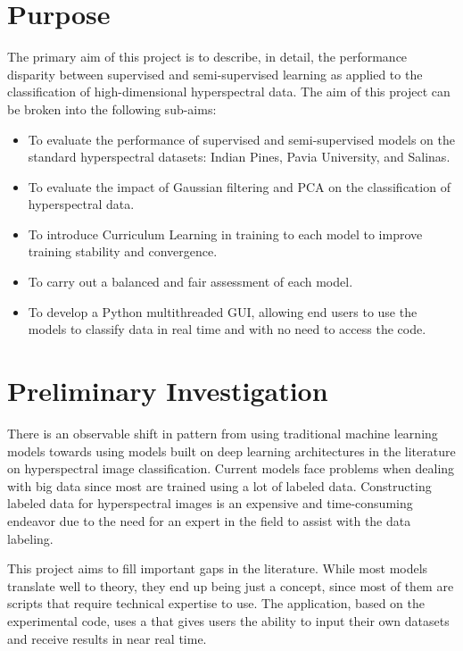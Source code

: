 \section{Purpose}
The primary aim of this project is to describe, in detail, the performance disparity between supervised and semi-supervised learning as applied to the classification of high-dimensional hyperspectral data. The aim of this project can be broken into the following sub-aims:
\begin{itemize}
    \item To evaluate the performance of supervised and semi-supervised models on the standard hyperspectral datasets: Indian Pines, Pavia University, and Salinas.
    \item To evaluate the impact of Gaussian filtering and PCA on the classification of hyperspectral data.
    \item To introduce Curriculum Learning in training to each model to improve training stability and convergence.
    \item To carry out a balanced and fair assessment of each model.
    \item To develop a Python multithreaded GUI, allowing end users to use the models to classify data in real time and with no need to access the code.
\end{itemize}

\section{Preliminary Investigation}
There is an observable shift in pattern from using traditional machine learning models towards using models built on deep learning architectures in the literature on hyperspectral image classification. Current models face problems when dealing with big data since most are trained using a lot of labeled data. Constructing labeled data for hyperspectral images is an expensive and time-consuming endeavor due to the need for an expert in the field to assist with the data labeling.

This project aims to fill important gaps in the literature. While most models translate well to theory, they end up being just a concept, since most of them are scripts that require technical expertise to use. The application, based on the experimental code, uses a that gives users the ability to input their own datasets and receive results in near real time.

